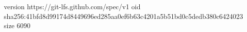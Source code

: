version https://git-lfs.github.com/spec/v1
oid sha256:41bfd8d99174d8449696ed285aa0ef6b63c4201a5b51bd0c5dedb380c6424023
size 6090
